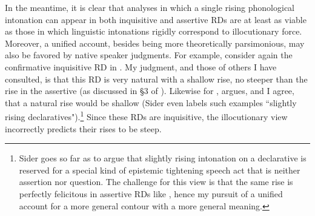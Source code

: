 \documentclass[output=paper,colorlinks,citecolor=brown]{langscibook}
\begin{document}
	In the meantime, it is clear that analyses in which a single rising phonological intonation can appear in both inquisitive and assertive RDs are at least as viable as those in which linguistic intonations rigidly correspond to illocutionary force. Moreover, a unified account, besides being more theoretically parsimonious, may also be favored by native speaker judgments. For example, consider again the confirmative inquisitive RD in . My judgment, and those of others I have consulted, is that this RD is very natural with a shallow rise, no steeper than the rise in the assertive  (as discussed in \S3 of \citealt{goodhue21:lsa}). Likewise for , \citet{sider22} argues, and I agree, that a natural rise would be shallow (Sider even labels such examples ``slightly rising declaratives").\footnote{Sider goes so far as to argue that slightly rising intonation on a declarative is reserved for a special kind of epistemic tightening speech act that is neither assertion nor question. The challenge for this view is that the same rise is perfectly felicitous in assertive RDs like , hence my pursuit of a unified account for a more general contour \rise with a more general meaning.} Since these RDs are inquisitive, the illocutionary view incorrectly predicts their rises to be steep. 
	
\end{document}
